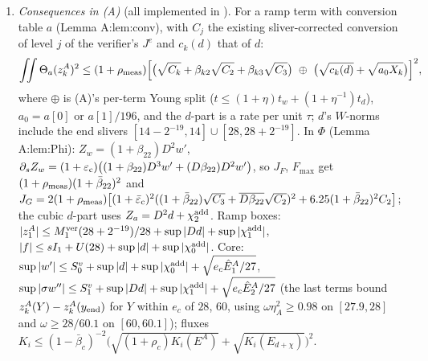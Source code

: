 \begin{lemma}
\begin{enumerate}
\item[(iv)] \emph{Consequences in (A)} (all implemented in ). For a ramp term with conversion table $a$ (Lemma A:lem:conv), with $C_j$ the existing sliver-corrected conversion of level $j$ of the verifier's $J^e$ and $c_k(d)$ that of $d$:
\[
\iint\Theta_a(z^A_k)^2\le(1+\rho_{\rm meas})\Bigl[\bigl(\sqrt{C_k}+\beta_{k2}\sqrt{C_2}+\beta_{k3}\sqrt{C_3}\bigr)\ \oplus\ \bigl(\sqrt{c_k(d)}+\sqrt{a_0X_k}\bigr)\Bigr]^2 ,
\]
where $\oplus$ is (A)'s per-term Young split ($t\le(1+\eta)t_w+(1+\eta^{-1})t_d$), $a_0=a[0]$ or $a[1]/196$, and the $d$-part is a rate per unit $\tau$; $d$'s $W$-norms include the end slivers $[14-2^{-19},14]\cup[28,28+2^{-19}]$. In $\Phi$ (Lemma A:lem:Phi): $Z_w=(1+\beta_{22})D^2w'$, $\partial_sZ_w=(1+\varepsilon_{\rm c})\bigl((1+\beta_{22})D^3w'+(D\beta_{22})D^2w'\bigr)$, so $J_F$, $F_{\max}$ get $(1+\rho_{\rm meas})(1+\bar\beta_{22})^2$ and $J_G=2(1+\rho_{\rm meas})\bigl[(1+\bar\varepsilon_{\rm c})^2((1+\bar\beta_{22})\sqrt{C_3}+\overline{D\beta_{22}}\sqrt{C_2})^2+6.25(1+\bar\beta_{22})^2C_2\bigr]$; the cubic $d$-part uses $Z_a=D^2d+\chi^{\rm add}_2$. Ramp boxes: $|z^A_1|\le M_1^{\rm ver}(28+2^{-19})/28+\sup|Dd|+\sup|\chi^{\rm add}_1|$, $|f|\le sI_1+U(28)+\sup|d|+\sup|\chi^{\rm add}_0|$. Core: $\sup|w'|\le S^v_0+\sup|d|+\sup|\chi^{\rm add}_0|+\sqrt{e_c\hat E^A_1/27}$, $\sup|\sigma w''|\le S^v_1+\sup|Dd|+\sup|\chi^{\rm add}_1|+\sqrt{e_c\hat E^A_2/27}$ (the last terms bound $z^A_k(Y)-z^A_k(y_{\rm end})$ for $Y$ within $e_c$ of $28$, $60$, using $\omega\eta_A^2\ge0.98$ on $[27.9,28]$ and $\omega\ge28/60.1$ on $[60,60.1]$); fluxes $K_i\le(1-\bar\beta_c)^{-2}\bigl(\sqrt{(1+\rho_c)K_i(E^A)}+\sqrt{K_i(E_{d+\chi})}\bigr)^2$.
\end{enumerate}
\end{lemma}

